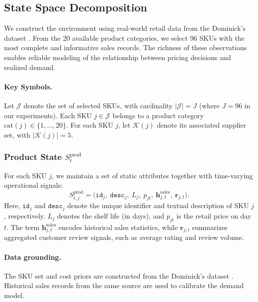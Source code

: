 
\subsection{State Space Decomposition}

We construct the environment using real-world retail data from the Dominick’s dataset \citep{DominicksDataset}. From the 20 available product categories, we select 96 SKUs with the most complete and informative sales records. The richness of these observations enables reliable modeling of the relationship between pricing decisions and realized demand.

\paragraph{Key Symbols.}
Let $\mathcal{J}$ denote the set of selected SKUs, with cardinality $|\mathcal{J}| = J$ (where $J=96$ in our experiments). Each SKU $j \in \mathcal{J}$ belongs to a product category $\mathrm{cat}(j) \in \{1,\ldots,20\}$. For each SKU $j$, let $\mathcal{K}(j)$ denote its associated supplier set, with $|\mathcal{K}(j)| = 5$.

\subsubsection{Product State $S_t^{\text{prod}}$}

For each SKU $j$, we maintain a set of static attributes together with time-varying operational signals:
\begin{equation}
S_{t,j}^{\text{prod}} =
\big(
\texttt{id}_j,\ \texttt{desc}_j,\ L_j,\ p_{jt},\ \mathbf{h}^{\text{sales}}_{j,t},\ \mathbf{r}_{j,t}
\big).
\end{equation}
Here, $\texttt{id}_j$ and $\texttt{desc}_j$ denote the unique identifier and textual description of SKU $j$, respectively. $L_j$ denotes the shelf life (in days), and $p_{jt}$ is the retail price on day $t$. The term $\mathbf{h}^{\text{sales}}_{j,t}$ encodes historical sales statistics, while $\mathbf{r}_{j,t}$ summarizes aggregated customer review signals, such as average rating and review volume.

\paragraph{Data grounding.}
The SKU set and cost priors are constructed from the Dominick’s dataset \citep{DominicksDataset}. Historical sales records from the same source are used to calibrate the demand model.

